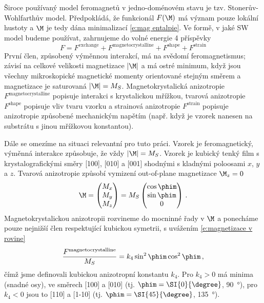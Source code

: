 Široce používaný model feromagnetů v jedno-doménovém stavu je tzv. Stonerův-Wohlfarthův model\cite{StonerWohlfarth}.
Předpokládá, že funkcionál $F(\M)$ má význam pouze lokální hustoty a $\M$ je tedy dána minimalizací \eqref{e:mag entalpie}.
Ve formě, v jaké SW model budeme používat, zahrnujeme do volné energie 4 příspěvky\cite{Reichlova}\cite{Janda}\cite{Kucharik}
\begin{equation}
F=F^\textrm{exchange} + F^\textrm{magnetocrystalline} + F^\textrm{shape} + F^\textrm{strain}
\end{equation}
První člen, způsobený výměnnou interakcí, má na svědomí feromagnetismus; závisí na celkové velikosti magnetizace $|\M|$ a má ostré minimum, když jsou všechny mikroskopické magnetické momenty orientované stejným směrem a magnetizace je saturovaná $|\M|=M_S$.
Magnetokrystalická anizotropie $F^\textrm{magnetocrystalline}$ popisuje interakci s krystalickou mřížkou, tvarová anizotropie $F^\textrm{shape}$ popisuje vliv tvaru vzorku a strainová anizotropie $F^\textrm{strain}$ popisuje anizotropie způsobené mechanickým napětím (např. když je vzorek nanesen na substrátu s jinou mřížkovou konstantou).

Dále se omezíme na situaci relevantní pro tuto práci.
Vzorek je feromagnetický, výměnná interakce způsobuje, že vždy $|\M|=M_S$.
Vzorek je kubický tenký film s krystalografickými směry [100], [010] a [001] shodnými s kladnými poloosami $x$, $y$ a $z$.
Tvarová anizotropie způsobí vymizení out-of-plane magnetizace $\M_z=0$
\begin{equation} \label{e:magnetizace v rovine}
\M=\begin{pmatrix}
M_x \\ M_y \\ M_z
\end{pmatrix} = M_S \begin{pmatrix}
\cos \phim \\ \sin \phim \\ 0
\end{pmatrix} \,.
\end{equation}
Magnetokrystalickou anizotropii rozvineme do mocninné řady v $\M$ a ponecháme pouze nejnižší člen respektující kubickou symetrii, s uvážením \eqref{e:magnetizace v rovine}
\begin{equation}
\frac{F^\textrm{magnetocrystalline}}{M_S}=k_4 \sin^2 \phim \cos^2 \phim \,,
\end{equation}
čímž jsme definovali kubickou anizotropní konstantu $k_4$.
Pro $k_4>0$ má minima (snadné osy), ve směrech [100] a [010] (tj. $\phim=\SI{0}{\degree}$, \SI{90}{\degree}), pro $k_4<0$ jsou to [110] a [1-10] (tj. $\phim=\SI{45}{\degree}$, \SI{135}{\degree}).

